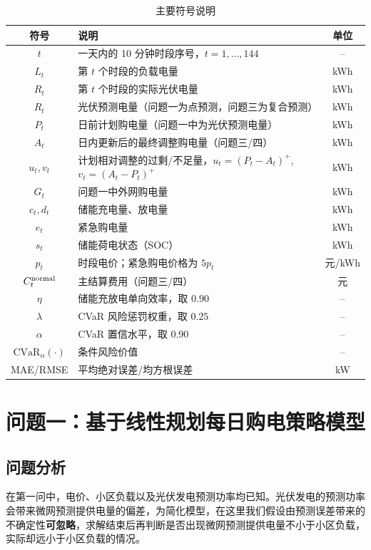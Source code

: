 \documentclass[withoutpreface,bwprint]{cumcmthesis} %
\begin{document}
\begin{table}[H]
  \centering
  \caption{主要符号说明}
  \label{tab:symbols}
  \small
  \begin{tabularx}{\textwidth}{cXc}
    \toprule
    符号 & 说明 & 单位 \\
    \midrule
    $t$ & 一天内的 10 分钟时段序号，$t=1,\dots,144$ & -- \\
    $L_t$ & 第 $t$ 个时段的负载电量 & kWh \\
    $R_t$ & 第 $t$ 个时段的实际光伏电量 & kWh \\
    $\hat R_t$ & 光伏预测电量（问题一为点预测，问题三为复合预测） & kWh \\
    $P_t$ & 日前计划购电量（问题一中为光伏预测电量） & kWh \\
    $A_t$ & 日内更新后的最终调整购电量（问题三/四） & kWh \\
    $u_t,v_t$ & 计划相对调整的过剩/不足量，$u_t=(P_t-A_t)^+$, $v_t=(A_t-P_t)^+$ & kWh \\
    $G_t$ & 问题一中外网购电量 & kWh \\
    $c_t,d_t$ & 储能充电量、放电量 & kWh \\
    $e_t$ & 紧急购电量 & kWh \\
    $s_t$ & 储能荷电状态（SOC） & kWh \\
    $p_t$ & 时段电价；紧急购电价格为 $5p_t$ & 元/kWh \\
    $C_t^{\rm normal}$ & 主结算费用（问题三/四） & 元 \\
    $\eta$ & 储能充放电单向效率，取 $0.90$ & -- \\
    $\lambda$ & CVaR 风险惩罚权重，取 $0.25$ & -- \\
    $\alpha$ & CVaR 置信水平，取 $0.90$ & -- \\
    $\mathrm{CVaR}_\alpha(\cdot)$ & 条件风险价值 & -- \\
    MAE/RMSE & 平均绝对误差/均方根误差 & kW \\
    \bottomrule
  \end{tabularx}
\end{table}


\section{问题一：基于线性规划每日购电策略模型}
\subsection{问题分析}

在第一问中，电价、小区负载以及光伏发电预测功率均已知。光伏发电的预测功率会带来微网预测提供电量的偏差，为简化模型，在这里我们假设由预测误差带来的不确定性\textbf{可忽略}，求解结束后再判断是否出现微网预测提供电量不小于小区负载，实际却远小于小区负载的情况。
\end{document}
